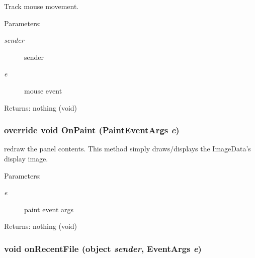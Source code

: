 Track mouse movement. 

\begin{Desc}
\item[Parameters:]
\begin{description}
\item[{\em sender}]sender \item[{\em e}]mouse event \end{description}
\end{Desc}
\begin{Desc}
\item[Returns:]nothing (void) \end{Desc}
\subsubsection{\setlength{\rightskip}{0pt plus 5cm}override void On\-Paint (Paint\-Event\-Args {\em e})\hspace{0.3cm}{\tt  [protected]}}\label{class_c_s_image_viewer_1_1_c_s_image_viewer_7b49a512aef9068aebdc17097736f6b9}


redraw the panel contents. This method simply draws/displays the Image\-Data's display image. 

\begin{Desc}
\item[Parameters:]
\begin{description}
\item[{\em e}]paint event args \end{description}
\end{Desc}
\begin{Desc}
\item[Returns:]nothing (void) \end{Desc}
\subsubsection{\setlength{\rightskip}{0pt plus 5cm}void on\-Recent\-File (object {\em sender}, Event\-Args {\em e})\hspace{0.3cm}{\tt  [private]}}\label{class_c_s_image_viewer_1_1_c_s_image_viewer_901e4a44b87cc12abf2d8dfcaed623d4}


